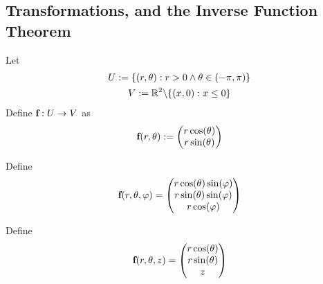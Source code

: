 \documentclass[11pt]{article}
\begin{document}
		\subsection{Transformations, and the Inverse Function Theorem}
			\begin{example}
				Let
				\begin{gather}
					U := \{(r, \theta): r > 0 \land \theta \in (-\pi, \pi)\} \\
					V := \mathbb{R}^2 \backslash \{(x,0): x \leq 0\}
				\end{gather}
				Define $\textbf{f}: U \to V$ as
				\begin{equation}
					\textbf{f}(r, \theta) := \begin{pmatrix}
 						r\cos(\theta) \\
 						r\sin(\theta)
 					\end{pmatrix}
				\end{equation}
			\end{example}
			
			\begin{example}
				Define
				\begin{equation}
					\textbf{f}(r, \theta, \varphi) = \begin{pmatrix}
						r \cos(\theta) \sin(\varphi) \\
						r \sin(\theta) \sin(\varphi) \\
						r\cos(\varphi)
					\end{pmatrix}
				\end{equation}
			\end{example}
			
			\begin{example}
				Define
				\begin{equation}
					\textbf{f}(r, \theta, z) = \begin{pmatrix}
						r \cos(\theta) \\
						r \sin(\theta) \\
						z
					\end{pmatrix}
				\end{equation}
			\end{example}
			
\end{document}
